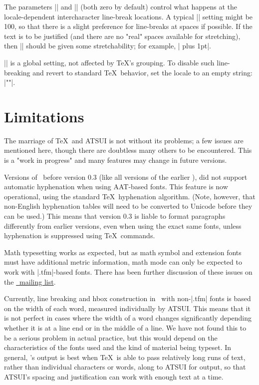 \CMDI{\XeTeXlinebreakskip}

\CMDI{\XeTeXlinebreakpenalty}

The parameters |\XeTeXlinebreakskip| and |\XeTeXlinebreakpenalty| (both zero by default) control what happens at the locale-dependent intercharacter line-break locations. A typical |\XeTeXlinebreakpenalty| setting might be 100, so that there is a slight preference for line-breaks at spaces if possible. If the text is to be justified (and there are no "real" spaces available for stretching), then |\XeTeXlinebreakskip| should be given some stretchability; for example, |\XeTeXlinebreakskip=0pt plus 1pt|.


\CMDI{\XeTeXlinebreaklocale} 

|\XeTeXlinebreaklocale| is a global setting, not affected by \TeX's grouping. To disable such line-breaking and revert to standard \TeX\ behavior, set the locale to an empty string: |\XeTeXlinebreaklocale ""|.

\section{Limitations}

The marriage of \TeX\ and ATSUI is not without its problems; a few issues are mentioned here, though there are doubtless many others to be encountered. This is a "work in progress" and many features may change in future versions.

Versions of \XeTeX\ before version 0.3 (like all versions of the earlier \TeXgX), did not support automatic hyphenation when using AAT-based fonts. This feature is now operational, using the standard \TeX\ hyphenation algorithm. (Note, however, that non-English hyphenation tables will need to be converted to Unicode before they can be used.) This means that version 0.3 is liable to format paragraphs differently from earlier versions, even when using the exact same fonts, unless hyphenation is suppressed using \TeX\ commands.

Math typesetting works as expected, but as math symbol and extension fonts must have additional metric information, math mode can only be expected to work with |.tfm|-based fonts. There has been further discussion of these issues on the \href{http://tug.org/mailman/listinfo/xetex}{\XeTeX\ mailing list}.

Currently, line breaking and hbox construction in \XeTeX\ with non-|.tfm| fonts is based on the width of each word, measured individually by ATSUI. This means that it is not perfect in cases where the width of a word changes significantly depending whether it is at a line end or in the middle of a line. We have not found this to be a serious problem in actual practice, but this would depend on the characteristics of the fonts used and the kind of material being typeset. In general, \XeTeX’s output is best when \TeX\ is able to pass relatively long runs of text, rather than individual characters or words, along to ATSUI for output, so that ATSUI's spacing and justification can work with enough text at a time.

